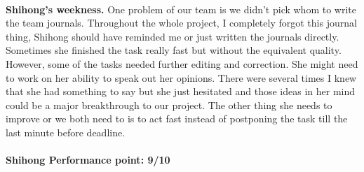 \documentclass[12pt,letterpaper]{article}
\theoremstyle{definition}
\begin{document}
\vspace{1 mm}
\noindent  \\
 {\bf Shihong's weekness.} One problem of our team is we didn't pick whom to write the team journals. Throughout the whole project, I completely forgot this journal thing, Shihong should have reminded me or just written the journals directly.  Sometimes she finished the task really fast but without the equivalent quality. However, some of the tasks needed further editing and correction. She might need to work on her ability to speak out her opinions. There were several times I knew that she had something to say but she just hesitated and those ideas in her mind could be a major breakthrough to our project. The other thing she needs to improve or we both need to is to act fast instead of postponing the task till the last minute before deadline.\\
\vspace{1 mm}
\noindent  \\
{\bf Shihong Performance point: 9/10}\\
\end{document}

